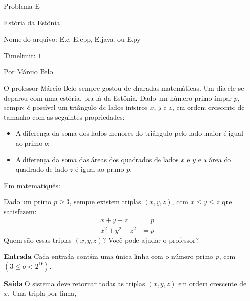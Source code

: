 \begin{center}
Problema E

Estória da Estônia

{\small Nome do arquivo: E.c, E.cpp, E.java, ou E.py}

{\large Timelimit: $1$}

{\tiny Por Márcio Belo}

\end{center}			

O professor Márcio Belo sempre gostou de charadas matemáticas. Um dia ele se deparou com uma estória, pra lá da Estônia. Dado um número primo ímpar $p$, sempre é possível um triângulo de lados inteiros $x$, $y$ e $z$, em ordem crescente de tamanho com as seguintes propriedades: 
\begin{itemize}
    \item A diferença da soma dos lados menores do triângulo pelo lado maior é igual ao primo $p$; 
    \item A diferença da soma das áreas dos quadrados de lados $x$ e $y$ e a área do quadrado de lado $z$ é igual ao primo $p$. 
\end{itemize}
Em matematiquês:

\vspace{3mm}
Dado um primo $p \geq 3$, sempre existem triplas $(x,y,z)$, com $x \leq y \leq z$ que satisfazem: 
\begin{align*}
    x + y - z & = p \\
    x^{2} + y^{2} - z^{2} & = p 
\end{align*}
Quem são essas triplas $(x,y,z)$? Você pode ajudar o professor?

\vspace{0.3cm}
\textbf{Entrada}
Cada entrada contém uma única linha com o número primo $p$, com $(3 \leq p < 2^{16})$. 

\vspace{0.3cm}
\textbf{Saída}
O sistema deve retornar todas as triplas $(x,y,z)$ em ordem crescente de $x$. Uma tripla por linha,  

